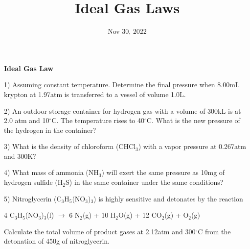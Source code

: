 \documentclass[12pt]{article}
\title{\textbf{Ideal Gas Laws}}
\date{Nov 30, 2022}
\begin{document}
\maketitle 

\textbf{Ideal Gas Law}

1) Assuming constant temperature. Determine the final pressure when 8.00mL
krypton at 1.97atm is transferred to a vessel of volume 1.0L.

\vspace{0.25in}

2) An outdoor storage container for hydrogen gas with a volume of 300kL is
at 2.0 atm and 10$^\circ$C. The temperature rises to 40$^\circ$C. What is the
new pressure of the hydrogen in the container?

\vspace{0.25in}

3) What is the density of chloroform (CHCl$_3$) with a vapor pressure
at 0.267atm and 300K?

\vspace{0.25in}

4) What mass of ammonia (NH$_3$) will exert the same pressure as 10mg of
hydrogen sulfide (H$_2$S) in the same container under the same conditions?

\vspace{0.25in}

5) Nitroglycerin (C$_3$H$_5$(NO$_3$)$_3$) is highly sensitive and detonates
by the reaction

4 C$_3$H$_5$(NO$_3$)$_3$(l) $\rightarrow$ 6 N$_2$(g) + 10 H$_2$O(g) + 12 CO$_2$(g)
+ O$_2$(g)

Calculate the total volume of product gases at 2.12atm and 300$^\circ$C from
the detonation of 450g of nitroglycerin.
\end{document}
